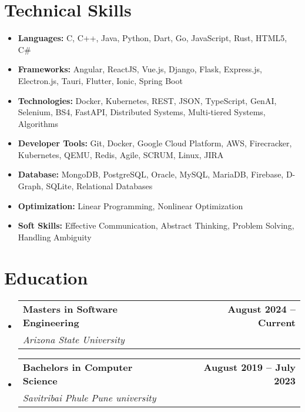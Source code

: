 \documentclass[letterpaper,11pt]{article}
\makeatletter
\newcommand{\resumeItem}[1]{
  \item\small{
    {#1 \vspace{-2pt}}
  }
}
\newcommand{\resumeSubheading}[4]{
  \vspace{-2pt}\item
    \begin{tabular*}{0.97\textwidth}[t]{l@{\extracolsep{\fill}}r}
      \textbf{\small#1} & \textbf{\small#2} \\
      \textit{\small#3} & \textit{\small#4} \\
    \end{tabular*}\vspace{-7pt}
}
\newcommand{\resumeSubItem}[1]{\resumeItem{#1}\vspace{-4pt}}
\newcommand{\resumeSubHeadingListStart}{\begin{itemize}[leftmargin=0.15in, label={}]}
\newcommand{\resumeSubHeadingListEnd}{\end{itemize}}
\makeatother
\begin{document}
\section{Technical Skills}
\resumeSubHeadingListStart
  \resumeSubItem{\textbf{Languages:} C, C++, Java, Python, Dart, Go, JavaScript, Rust, HTML5, C#}
  \resumeSubItem{\textbf{Frameworks:} Angular, ReactJS, Vue.js, Django, Flask, Express.js, Electron.js, Tauri, Flutter, Ionic, Spring Boot}
  \resumeSubItem{\textbf{Technologies:} Docker, Kubernetes, REST, JSON, TypeScript, GenAI, Selenium, BS4, FastAPI, Distributed Systems, Multi-tiered Systems, Algorithms}
  \resumeSubItem{\textbf{Developer Tools:} Git, Docker, Google Cloud Platform, AWS, Firecracker, Kubernetes, QEMU, Redis, Agile, SCRUM, Linux, JIRA}
  \resumeSubItem{\textbf{Database:} MongoDB, PostgreSQL, Oracle, MySQL, MariaDB, Firebase, D-Graph, SQLite, Relational Databases}
  \resumeSubItem{\textbf{Optimization:} Linear Programming, Nonlinear Optimization}
  \resumeSubItem{\textbf{Soft Skills:} Effective Communication, Abstract Thinking, Problem Solving, Handling Ambiguity}
\resumeSubHeadingListEnd

\section{Education}
  \resumeSubHeadingListStart
    \resumeSubheading
      {Masters in Software Engineering}{August 2024 -- Current}
      {Arizona State University}{}
    \resumeSubheading
      {Bachelors in Computer Science}{August 2019 -- July 2023}
      {Savitribai Phule Pune university}{}
  \resumeSubHeadingListEnd
\end{document}
